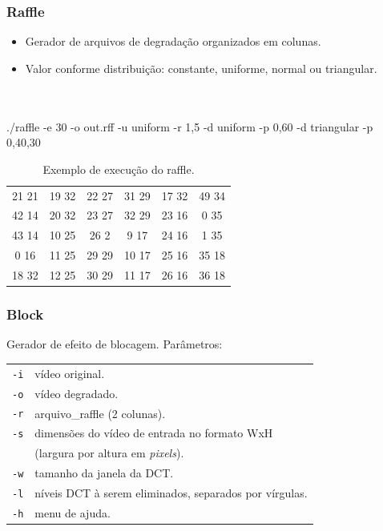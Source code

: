     \begin{frame}\frametitle{Raffle}
        \begin{itemize}
            \item Gerador de arquivos de degradação organizados em colunas.
            \item Valor conforme distribuição: constante, uniforme, normal ou triangular.
        \end{itemize}
        \\ ~\\
        ./raffle -e 30 -o out.rff -u uniform -r 1,5 -d uniform -p 0,60 -d triangular -p 0,40,30
        \begin{table}[!h]
            \centering
            \caption{Exemplo de execução do raffle.}
            \label{tab:rafflerun}
            \begin{tabular}{|c|c|c|c|c|c|}
                \hline
                21 21 & 19 32 & 22 27 & 31 29 & 17 32 & 49 34 \\
                42 14 & 20 32 & 23 27 & 32 29 & 23 16 &  0 35 \\
                43 14 & 10 25 & 26  2 &  9 17 & 24 16 &  1 35 \\
                 0 16 & 11 25 & 29 29 & 10 17 & 25 16 & 35 18 \\
                18 32 & 12 25 & 30 29 & 11 17 & 26 16 & 36 18 \\
                \hline
            \end{tabular}
        \end{table}
    \end{frame}

    \begin{frame}\frametitle{Block}
        Gerador de efeito de blocagem. Parâmetros:
        \begin{table}[!h]
	        \begin{tabular}{ll}
	            \texttt{-i}  & vídeo original. \\
	            \texttt{-o}  & vídeo degradado. \\
	            \texttt{-r}  & arquivo\_raffle (2 colunas). \\
	            \texttt{-s}  & dimensões do vídeo de entrada no formato WxH \\ 
	            & (largura por altura em \emph{pixels}). \\
	            \texttt{-w}  & tamanho da janela da DCT. \\
	            \texttt{-l}  & níveis DCT à serem eliminados, separados por vírgulas. \\
	            \texttt{-h}  & menu de ajuda. \\
            \end{tabular}
        \end{table}
    \end{frame}
    
